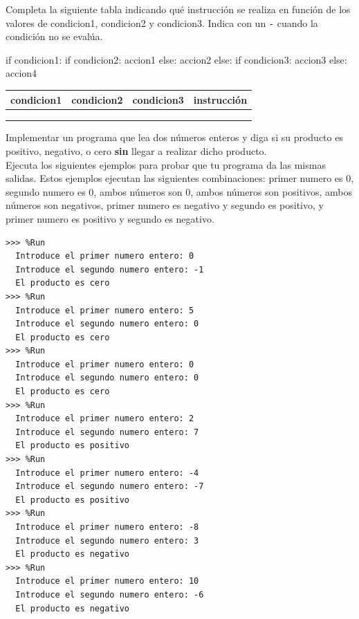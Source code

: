 \begin{ejercicio}Completa la siguiente tabla indicando qué instrucción se realiza en función de los valores de condicion1, condicion2 y condicion3. Indica con un \verb|-| cuando la condición no se evalúa.

\begin{python}
if condicion1:
    if condicion2:
        accion1
    else:
        accion2
else:
    if condicion3:
        accion3
    else:
        accion4
\end{python}


\begin{tabular}{|l|l|l|l|}
\hline
condicion1 & condicion2 & condicion3 & instrucción \\
\hline
\hline
           &            &            &             \\ \hline
           &            &            &        
          \\ \hline
                     &            &            &        
          \\ \hline
\end{tabular}
\end{ejercicio}


\begin{ejercicio}\label{prod_sin_mult}
Implementar un programa que lea dos números enteros y diga si su producto es positivo, negativo, o cero \textbf{sin} llegar a realizar dicho producto. \\

Ejecuta los siguientes ejemplos para probar que tu programa da las mismas salidas. Estos ejemplos ejecutan las siguientes combinaciones: 
primer numero es 0, 
segundo numero es 0, 
ambos números son 0, 
ambos números son positivos, 
ambos números son negativos, 
primer numero es negativo y segundo es positivo, 
y primer numero es positivo y segundo es negativo.\\



\begin{Verbatim}[frame=single, label={\em ejemplos y posibles tests de ejecución}]
>>> %Run
  Introduce el primer numero entero: 0
  Introduce el segundo numero entero: -1
  El producto es cero
>>> %Run 
  Introduce el primer numero entero: 5
  Introduce el segundo numero entero: 0
  El producto es cero
>>> %Run 
  Introduce el primer numero entero: 0
  Introduce el segundo numero entero: 0
  El producto es cero
>>> %Run
  Introduce el primer numero entero: 2
  Introduce el segundo numero entero: 7
  El producto es positivo
>>> %Run 
  Introduce el primer numero entero: -4
  Introduce el segundo numero entero: -7
  El producto es positivo
>>> %Run 
  Introduce el primer numero entero: -8
  Introduce el segundo numero entero: 3
  El producto es negativo
>>> %Run 
  Introduce el primer numero entero: 10
  Introduce el segundo numero entero: -6
  El producto es negativo
\end{Verbatim}
\end{ejercicio}



